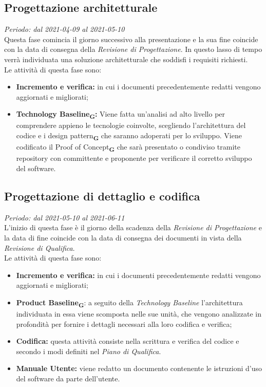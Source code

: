     \subsection{Progettazione architetturale}
        \textit{Periodo: dal 2021-04-09 al 2021-05-10}\\
        Questa fase comincia il giorno successivo alla presentazione e la sua fine coincide con la data di consegna della \textit{Revisione di Progettazione}. In questo lasso di tempo verrà individuata una soluzione architetturale che soddisfi i requisiti richiesti.\\
        Le attività di questa fase sono:
        \begin {itemize}
            \item \textbf{Incremento e verifica:} in cui i documenti precedentemente redatti vengono aggiornati e migliorati;
            \item \textbf{Technology Baseline\textsubscript{\textbf{G}}:} Viene fatta un’analisi ad alto livello per comprendere appieno le tecnologie coinvolte, scegliendo l’architettura del codice e i design pattern\textsubscript{\textbf{G}} che saranno adoperati per lo sviluppo. Viene codificato il Proof of Concept\textsubscript{\textbf{G}} che sarà presentato o condiviso tramite repository con committente e proponente per verificare il corretto sviluppo del software.
        \end {itemize}

    \subsection{Progettazione di dettaglio e codifica}
        \textit{Periodo: dal 2021-05-10 al 2021-06-11}\\
        L’inizio di questa fase è il giorno della scadenza della \textit{Revisione di Progettazione} e la data di fine coincide con la data di consegna dei documenti in vista della \textit{Revisione di Qualifica}.\\
        Le attività di questa fase sono:
        \begin {itemize}
            \item \textbf{Incremento e verifica:} in cui i documenti precedentemente redatti vengono aggiornati e migliorati;
            \item \textbf{Product Baseline\textsubscript{\textbf{G}}}: a seguito della \textit{Technology Baseline} l’architettura individuata in essa viene scomposta nelle sue unità, che vengono analizzate in profondità per fornire i dettagli necessari alla loro codifica e verifica;
            \item \textbf{Codifica:} questa attività consiste nella scrittura e verifica del codice e secondo i modi definiti nel \textit{Piano di Qualifica}.
            \item \textbf{Manuale Utente:} viene redatto un documento contenente le istruzioni d'uso del software da parte dell'utente.
        \end {itemize}
        

